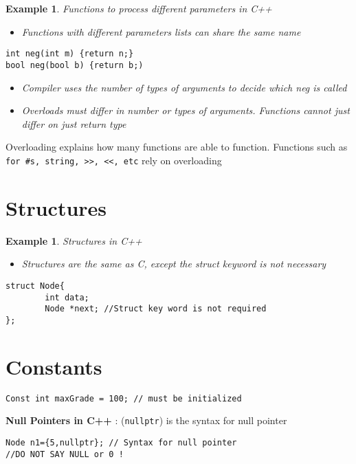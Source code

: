 \documentclass{article}
\newtheorem{ex}[theorem]{Example}
\begin{document}
\begin{ex} Functions to process different parameters in C++
\begin{itemize}
\item Functions with different parameters lists can share the same name 
\end{itemize}

\begin{lstlisting} 
int neg(int m) {return n;}
bool neg(bool b) {return b;)
\end{lstlisting}

\begin{itemize}
\item Compiler uses the  number of types of arguments to decide which neg is called 
\item Overloads must differ in number or types of arguments. Functions cannot just differ on just return type
\end{itemize}
\end{ex}

Overloading explains how many functions are able to function. Functions such as \verb|for #s, string, >>, <<, etc| rely on overloading

\section{Structures}
\begin{ex} Structures in C++
\begin{itemize}
\item Structures are the same as C, except the struct keyword is not necessary
\end{itemize}
\begin{lstlisting}
struct Node{
		int data;
	    Node *next; //Struct key word is not required
};
\end{lstlisting}
\end{ex}


\section{Constants}
\begin{lstlisting}
Const int maxGrade = 100; // must be initialized
\end{lstlisting}

\textbf{Null Pointers in C++} : (\verb|nullptr|) is the syntax for null pointer
\begin{lstlisting}
Node n1={5,nullptr}; // Syntax for null pointer
//DO NOT SAY NULL or 0 !
\end{lstlisting}
\end{document}
